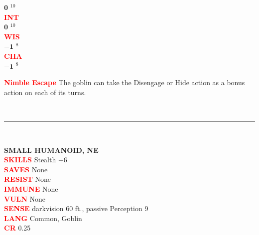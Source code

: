 \documentclass{article}
\begin{document}
\begin{adjustbox}{minipage=0.45\textwidth, margin=\fboxsep, bgimage=../images/texture2.pdf}
{\begin{minipage}[t][10.5in][t]{0.9\textwidth}
\begin{minipage}[t]{0.2\textwidth}
{            $\mathbf{0}$\,\,$^{10}$ \\[0.1em]
            \textcolor{red}{\textbf{INT}}\\[0.1em]
            $\mathbf{0}$\,\,$^{10}$ \\[0.1em]
            \textcolor{red}{\textbf{WIS}}\\[0.1em]
            $\mathbf{-1}$\,\,$^{8}$ \\[0.1em]
            \textcolor{red}{\textbf{CHA}}\\[0.1em]
            $\mathbf{-1}$\,\,$^{8}$ \\[0.1em]
            }
        \end{minipage}
        \hspace{-0.1in}
        \vline
        \hspace{0.1in}
        \begin{minipage}[t]{0.7\textwidth}
            \textcolor{red}{\textbf{Nimble Escape}} The goblin can take the Disengage or Hide action as a bonus action on each of its turns. \\[0.2em]
        \end{minipage}
        \vspace{0.025in}\\
        \rule{\textwidth}{1pt}\\
        \vspace{-0.08in}
        \begin{flushleft}
            {\large\textbf{SMALL HUMANOID, NE}}\\
            \textcolor{red}{\textbf{SKILLS}} Stealth +6 \\
            \textcolor{red}{\textbf{SAVES}} None \\
            \textcolor{red}{\textbf{RESIST}} None\\
            \textcolor{red}{\textbf{IMMUNE}} None\\
            \textcolor{red}{\textbf{VULN}} None\\      
            \textcolor{red}{\textbf{SENSE}} darkvision 60 ft., passive Perception 9\\
            \textcolor{red}{\textbf{LANG}} Common, Goblin\\
            \textcolor{red}{\textbf{CR}}  0.25\\
        \end{flushleft}
        \end{minipage}
    }
\end{adjustbox}                     
\end{document}
